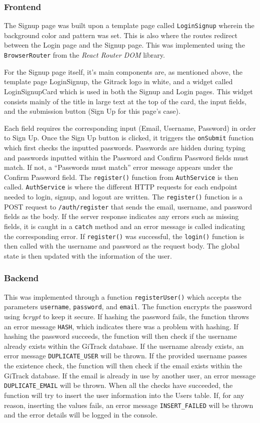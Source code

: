 \documentclass{article}
\def\code#1{\texttt{#1}}
\begin{document}
\subsubsection{Frontend}
The Signup page was built upon a template page called \code{LoginSignup} wherein
the background color and pattern was set. This is also where the routes redirect
between the Login page and the Signup page. This was implemented using the
\code{BrowserRouter} from the \emph{React Router DOM} library.

For the Signup page itself, it’s main components are, as mentioned above, the
template page LoginSignup, the Gitrack logo in white, and a widget called
LoginSignupCard which is used in both the Signup and Login pages. This widget
consists mainly of the title in large text at the top of the card, the input
fields, and the submission button (Sign Up for this page’s case).

Each field requires the corresponding input (Email, Username, Password) in order
to Sign Up. Once the Sign Up button is clicked, it triggers the \code{onSubmit}
function which first checks the inputted passwords. Passwords are hidden during
typing and passwords inputted within the Password and Confirm Password fields
must match. If not, a “Passwords must match” error message appears under the
Confirm Password field. The \code{register()} function from \code{AuthService}
is then called. \code{AuthService} is where the different HTTP requests for each
endpoint needed to login, signup, and logout are written. The \code{register()}
function is a POST request to \code{/auth/register} that sends the email,
username, and password fields as the body. If the server response indicates any
errors such as missing fields, it is caught in a \code{catch} method and an
error message is called indicating the corresponding error. If \code{register()}
was successful, the \code{login()} function is then called with the username and
password as the request body. The global state is then updated with the
information of the user.

\subsubsection{Backend}
This was implemented through a function \code{registerUser()} which accepts the
parameters \code{username}, \code{password}, and \code{email}. The function
encrypts the password using \emph{bcrypt} to keep it secure. If hashing the
password fails, the function throws an error message \code{HASH}, which
indicates there was a problem with hashing. If hashing the password succeeds,
the function will then check if the username already exists within the GiTrack
database. If the username already exists, an error message
\code{DUPLICATE\_USER} will be thrown. If the provided username passes the
existence check, the function will then check if the email exists within the
GiTrack database. If the email is already in use by another user, an error
message \code{DUPLICATE\_EMAIL} will be thrown. When all the checks have
succeeded, the function will try to insert the user information into the Users
table. If, for any reason, inserting the values fails, an error message
\code{INSERT\_FAILED} will be thrown and the error details will be logged in the
console.
\end{document}
